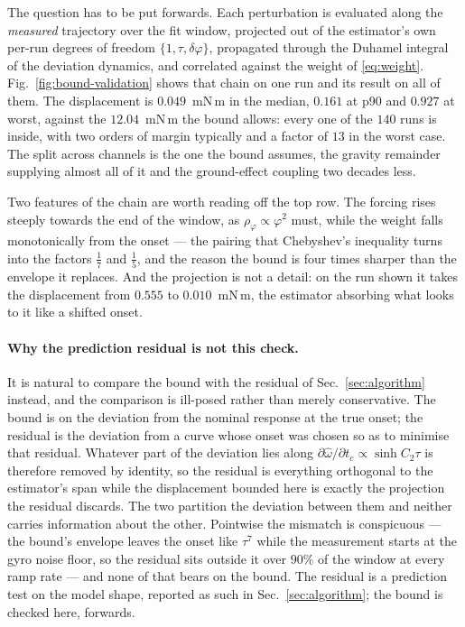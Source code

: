 The question has to be put forwards. Each perturbation is evaluated
along the \emph{measured} trajectory over the fit window, projected out
of the estimator's own per-run degrees of freedom $\{1,\tau,
\delta\varphi\}$, propagated through the Duhamel integral of the
deviation dynamics, and correlated against the weight of
\eqref{eq:weight}. Fig.~\ref{fig:bound-validation} shows that chain on
one run and its result on all of them. The displacement is $0.049$~mN\,m
in the median, $0.161$ at p90 and $0.927$ at worst, against the
$12.04$~mN\,m the bound allows: every one of the $140$ runs is inside,
with two orders of margin typically and a factor of $13$ in the worst
case. The split across channels is the one the bound assumes, the
gravity remainder supplying almost all of it and the ground-effect
coupling two decades less.

Two features of the chain are worth reading off the top row. The
forcing rises steeply towards the end of the window, as
$\rho_\varphi\propto\varphi^2$ must, while the weight falls
monotonically from the onset --- the pairing that Chebyshev's inequality
turns into the factors $\tfrac17$ and $\tfrac15$, and the reason the
bound is four times sharper than the envelope it replaces. And the
projection is not a detail: on the run shown it takes the displacement
from $0.555$ to $0.010$~mN\,m, the estimator absorbing what looks to it
like a shifted onset.

\paragraph{Why the prediction residual is not this check.}
It is natural to compare the bound with the residual of
Sec.~\ref{sec:algorithm} instead, and the comparison is ill-posed rather
than merely conservative. The bound is on the deviation from the
nominal response at the true onset; the residual is the deviation from
a curve whose onset was chosen so as to minimise that residual.
Whatever part of the deviation lies along $\partial\hat\omega/\partial
t_c\propto\sinh C_2\tau$ is therefore removed by identity, so the
residual is everything orthogonal to the estimator's span while the
displacement bounded here is exactly the projection the residual
discards. The two partition the deviation between them and neither
carries information about the other. Pointwise the mismatch is
conspicuous --- the bound's envelope leaves the onset like $\tau^7$
while the measurement starts at the gyro noise floor, so the residual
sits outside it over $90\%$ of the window at every ramp rate --- and
none of that bears on the bound. The residual is a prediction test on
the model shape, reported as such in Sec.~\ref{sec:algorithm}; the
bound is checked here, forwards.
